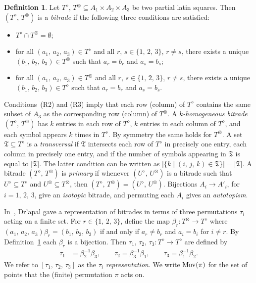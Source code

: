\documentclass[amstags,fleqn,reqno]{article}
\theoremstyle{plain}
\theoremstyle{definition}
\newtheorem{definition}[theorem]{Definition}
\newcommand{\Rdisjoint}{\textnormal{(R1)}\xspace}
\newcommand{\RtripA}{\textnormal{(R2)}\xspace}
\newcommand{\RtripB}{\textnormal{(R3)}\xspace}
\newcommand{\opa}{\diamond}
\newcommand{\opb}{\otimes}
\newcommand{\transversal}{\mathfrak{T}}
\newcommand{\mov}{\textnormal{Mov}}
\begin{document}
\begin{definition}\label{defnBitradeA123}
Let $T^{\opa}$, $T^{\opb} \subseteq A_1 \times A_2 \times A_3$ be
two partial latin squares. Then $(T^{\opa},\, T^{\opb})$ is a {\em
bitrade} if the following three conditions are satisfied:
\begin{itemize}

\item[\Rdisjoint] $T^{\opa} \cap T^{\opb} = \emptyset$;

\item[\RtripA] for all $(a_1,\, a_2,\, a_3) \in T^{\opa}$ and all $r$,
$s \in \{1,\, 2,\, 3\}$,
$r \neq s$, there exists a unique $(b_1,\, b_2,\, b_3) \in T^{\opb}$
such that $a_r=b_r$ and $a_s=b_s$;

\item[\RtripB] for all $(a_1,\, a_2,\, a_3) \in T^{\opb}$ and all $r$,
$s \in \{1,\, 2,\, 3\}$,
$r \neq s$, there exists a unique $(b_1,\, b_2,\, b_3) \in T^{\opa}$
such that $a_r=b_r$ and $a_s=b_s$.

\end{itemize}
\end{definition}

Conditions~\RtripA and \RtripB imply that each row (column) of
$T^{\opa}$ contains the same subset of $A_3$ as the corresponding row
(column) of $T^{\opb}$.  A {\em $k$-homogeneous bitrade} $(T^{\opa},\, T^{\opb})$ 
has $k$ entries in each row of $T^{\opa}$, $k$ entries in each column of
$T^{\opa}$, and each symbol appears $k$ times in $T^{\opa}$. By symmetry
the same holds for $T^{\opb}$. A set $\transversal \subseteq T^{\opa}$ is a {\em
transversal\/} if $\transversal$ intersects each row of $T^{\opa}$ in precisely one
entry, each column in precisely one entry, and if the number of symbols
appearing in $\transversal$ is equal to $\left| \transversal \right|$. The latter condition
can be written as
$\left| \{ k \mid (i,\, j,\, k) \in \transversal \} \right| = \left|
\transversal \right|$.
A bitrade $(T^{\opa},\, T^{\opb})$ is {\em primary\/}
if whenever $(U^{\opa},\,U^{\opb})$ is a bitrade such that
$U^{\opa}\subseteq
T^{\opa}$ 
and
$U^{\opb}\subseteq   
T^{\opb}$, then 
$(T^{\opa},\, T^{\opb})=  
(U^{\opa},\, U^{\opb})$.  
Bijections $A_i \rightarrow A'_i$, for $i = 1$, $2$, $3$, give an 
{\em isotopic} bitrade, and permuting each $A_i$ gives an {\em autotopism}.

In~\cite{Dr9}, Dr\a'apal gave a representation of bitrades in terms of
three permutations $\tau_i$ acting on a finite set.  
For $r \in \{1,\, 2,\, 3\}$, define the map 
$\beta_r \colon T^{\opb} \rightarrow
T^{\opa}$ where $(a_1,\, a_2,\, a_3) \beta_r = (b_1,\, b_2,\, b_3)$ if and only if
$a_r \neq b_r$
and $a_i = b_i$ for $i \neq r$.
By Definition~\ref{defnBitradeA123} each $\beta_r$ is a bijection.
Then
$\tau_1,\, \tau_2,\, \tau_3\colon T^{\opa} \rightarrow
T^{\opa}$ are defined by
\begin{align}
\tau_1 &= \beta_2^{-1}\beta_3, \qquad
\tau_2 = \beta_3^{-1}\beta_1, \qquad
\tau_3 = \beta_1^{-1}\beta_2. \label{eqnTau}
\end{align}
We refer to
$[\tau_1,\, \tau_2,\, \tau_3]$
as the $\tau_i$ {\em representation}.
We write $\mov(\pi)$ for the set of points that the (finite) permutation
$\pi$ acts on.
\end{document}
